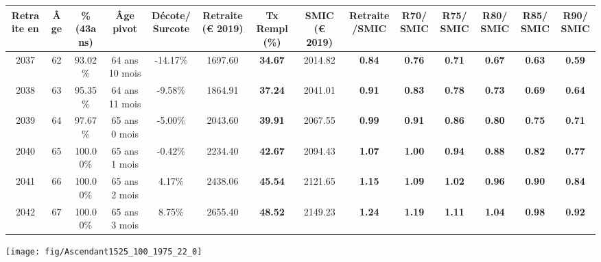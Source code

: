 \begin{adjustbox}{max width=\textwidth} 
\begin{tabular}[htb]{|c|c||c|c|c||c|c||c|c||c|c|c|c|c|} 
\hline 
 Retraite en &  Âge &  \%(43ans) &  Âge pivot &  Décote/Surcote &  Retraite (\euro{} 2019) &  Tx Rempl(\%) &  SMIC (\euro{} 2019) &  Retraite/SMIC &  R70/SMIC &  R75/SMIC &  R80/SMIC &  R85/SMIC &  R90/SMIC \\ 
\hline \hline 
 2037 &  62 &  93.02\% &  64 ans 10 mois &  -14.17\% &  1697.60 &  {\bf 34.67} &  2014.82 &  {\bf {\color{red} 0.84}} &  {\bf {\color{red} 0.76}} &  {\bf {\color{red} 0.71}} &  {\bf {\color{red} 0.67}} &  {\bf {\color{red} 0.63}} &  {\bf {\color{red} 0.59}} \\ 
\hline 
 2038 &  63 &  95.35\% &  64 ans 11 mois &  -9.58\% &  1864.91 &  {\bf 37.24} &  2041.01 &  {\bf {\color{red} 0.91}} &  {\bf {\color{red} 0.83}} &  {\bf {\color{red} 0.78}} &  {\bf {\color{red} 0.73}} &  {\bf {\color{red} 0.69}} &  {\bf {\color{red} 0.64}} \\ 
\hline 
 2039 &  64 &  97.67\% &  65 ans 0 mois &  -5.00\% &  2043.60 &  {\bf 39.91} &  2067.55 &  {\bf {\color{red} 0.99}} &  {\bf {\color{red} 0.91}} &  {\bf {\color{red} 0.86}} &  {\bf {\color{red} 0.80}} &  {\bf {\color{red} 0.75}} &  {\bf {\color{red} 0.71}} \\ 
\hline 
 2040 &  65 &  100.00\% &  65 ans 1 mois &  -0.42\% &  2234.40 &  {\bf 42.67} &  2094.43 &  {\bf 1.07} &  {\bf 1.00} &  {\bf {\color{red} 0.94}} &  {\bf {\color{red} 0.88}} &  {\bf {\color{red} 0.82}} &  {\bf {\color{red} 0.77}} \\ 
\hline 
 2041 &  66 &  100.00\% &  65 ans 2 mois &  4.17\% &  2438.06 &  {\bf 45.54} &  2121.65 &  {\bf 1.15} &  {\bf 1.09} &  {\bf 1.02} &  {\bf {\color{red} 0.96}} &  {\bf {\color{red} 0.90}} &  {\bf {\color{red} 0.84}} \\ 
\hline 
 2042 &  67 &  100.00\% &  65 ans 3 mois &  8.75\% &  2655.40 &  {\bf 48.52} &  2149.23 &  {\bf 1.24} &  {\bf 1.19} &  {\bf 1.11} &  {\bf 1.04} &  {\bf {\color{red} 0.98}} &  {\bf {\color{red} 0.92}} \\ 
\hline 
\hline 
\end{tabular} 
\end{adjustbox} 
 
 \vspace{0.1cm} 

 {\hspace{-2.2cm}\texttt{[image: fig/Ascendant1525\_100\_1975\_22\_0]}} 

